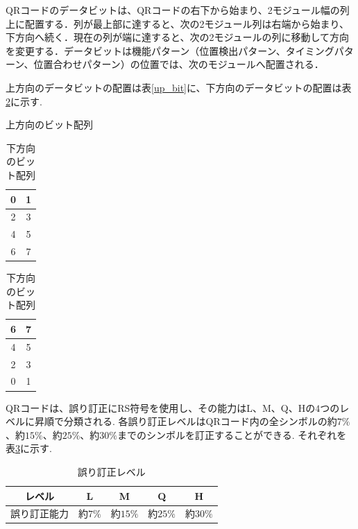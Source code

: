 \documentclass{thesis}
\begin{document}
QRコードのデータビットは、QRコードの右下から始まり、2モジュール幅の列上に配置する．列が最上部に達すると、次の2モジュール列は右端から始まり、下方向へ続く．現在の列が端に達すると、次の2モジュールの列に移動して方向を変更する．データビットは機能パターン（位置検出パターン、タイミングパターン、位置合わせパターン）の位置では、次のモジュールへ配置される．

上方向のデータビットの配置は表\ref{up_bit}に、下方向のデータビットの配置は表\ref{down_bit}に示す.

\begin{table}[h]
  \begin{minipage}[t]{.45\textwidth}
    \begin{center}
	\caption{上方向のビット配列 \label{up_bit}}
      \begin{tabular}{|c|c|} \hline
	0&1\\ \hline
	2&3\\ \hline
	4&5\\ \hline
	6&7\\ \hline
      \end{tabular}
    \end{center}
  \end{minipage}
  \hfill
  \begin{minipage}[t]{.55\textwidth}
    \begin{center}
	\caption{下方向のビット配列 \label{down_bit}}
      \begin{tabular}{|c|c|} \hline
	6&7\\ \hline
	4&5\\ \hline
	2&3\\ \hline
	0&1\\ \hline
      \end{tabular}
    \end{center}
  \end{minipage}
\end{table}

QRコードは、誤り訂正にRS符号を使用し、その能力はL、M、Q、Hの$4$つのレベルに昇順で分類される.
各誤り訂正レベルはQRコード内の全シンボルの約$7\%$、約$15\%$、約$25\%$、約$30\%$までのシンボルを訂正することができる.
それぞれを表\ref{Correction_ability}に示す.

\begin{table}[htbp]
\begin{center}
  \caption{誤り訂正レベル \label{Correction_ability}}
    \begin{tabular}{|c|c|c|c|c|} \hline
     レベル&L&M&Q&H\\ \hline\hline
     誤り訂正能力&約$7\%$&約$15\%$&約$25\%$&約$30\%$ \\ \hline
    \end{tabular}{}
\end{center}
\end{table}
\end{document}
